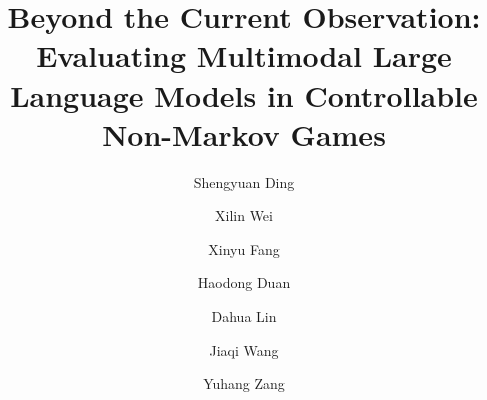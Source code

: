 \documentclass{llmxive}
\title{Beyond the Current Observation: Evaluating Multimodal Large Language Models in Controllable Non-Markov Games}
\author{Shengyuan Ding \and Xilin Wei \and Xinyu Fang \and Haodong Duan \and Dahua Lin \and Jiaqi Wang \and Yuhang Zang}
\providecommand{\benchname}{\textsc{RNG-Bench}\xspace}
\begin{document}
\maketitle
\begin{abstract}


\end{abstract}
\end{document}
